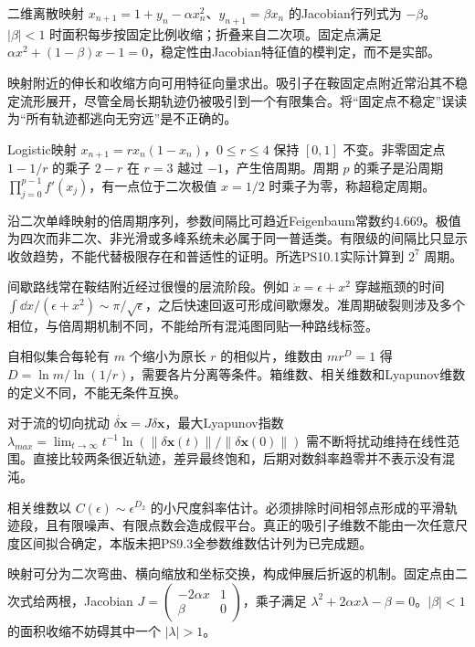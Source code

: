 二维离散映射 $x_{n+1}=1+y_n-\alpha x_n^2$、$y_{n+1}=\beta x_n$ 的Jacobian行列式为 $-\beta$。$|\beta|<1$ 时面积每步按固定比例收缩；折叠来自二次项。固定点满足 $\alpha x^2+(1-\beta)x-1=0$，稳定性由Jacobian特征值的模判定，而不是实部。

映射附近的伸长和收缩方向可用特征向量求出。吸引子在鞍固定点附近常沿其不稳定流形展开，尽管全局长期轨迹仍被吸引到一个有限集合。将“固定点不稳定”误读为“所有轨迹都逃向无穷远”是不正确的。

Logistic映射 $x_{n+1}=r x_n(1-x_n)$，$0\le r\le4$ 保持 $[0,1]$ 不变。非零固定点 $1-1/r$ 的乘子 $2-r$ 在 $r=3$ 越过 $-1$，产生倍周期。周期 $p$ 的乘子是沿周期 $\prod_{j=0}^{p-1}f'(x_j)$，有一点位于二次极值 $x=1/2$ 时乘子为零，称超稳定周期。

沿二次单峰映射的倍周期序列，参数间隔比可趋近Feigenbaum常数约4.669。极值为四次而非二次、非光滑或多峰系统未必属于同一普适类。有限级的间隔比只显示收敛趋势，不能代替极限存在和普适性的证明。所选PS10.1实际计算到 $2^7$ 周期。

间歇路线常在鞍结附近经过很慢的层流阶段。例如 $\dot x=\epsilon+x^2$ 穿越瓶颈的时间 $\int\dd x/(\epsilon+x^2)\sim\pi/\sqrt\epsilon$，之后快速回返可形成间歇爆发。准周期破裂则涉及多个相位，与倍周期机制不同，不能给所有混沌图同贴一种路线标签。

自相似集合每轮有 $m$ 个缩小为原长 $r$ 的相似片，维数由 $mr^D=1$ 得 $D=\ln m/\ln(1/r)$，需要各片分离等条件。箱维数、相关维数和Lyapunov维数的定义不同，不能无条件互换。

对于流的切向扰动 $\dot{\delta\mathbf x}=J\delta\mathbf x$，最大Lyapunov指数 $\lambda_{max}=\lim_{t\to\infty}t^{-1}\ln(\|\delta\mathbf x(t)\|/\|\delta\mathbf x(0)\|)$ 需不断将扰动维持在线性范围。直接比较两条很近轨迹，差异最终饱和，后期对数斜率趋零并不表示没有混沌。

相关维数以 $C(\epsilon)\sim\epsilon^{D_2}$ 的小尺度斜率估计。必须排除时间相邻点形成的平滑轨迹段，且有限噪声、有限点数会造成假平台。真正的吸引子维数不能由一次任意尺度区间拟合确定，本版未把PS9.3全参数维数估计列为已完成题。

映射可分为二次弯曲、横向缩放和坐标交换，构成伸展后折返的机制。固定点由二次式给两根，Jacobian $J=\begin{pmatrix}-2\alpha x&1\\\beta&0\end{pmatrix}$，乘子满足 $\lambda^2+2\alpha x\lambda-\beta=0$。$|\beta|<1$ 的面积收缩不妨碍其中一个 $|\lambda|>1$。

